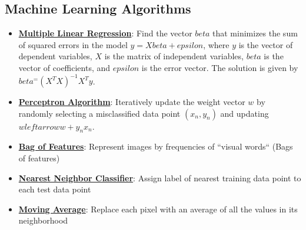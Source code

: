 \documentclass{article}%
\begin{document}
\subsection{Machine Learning Algorithms}%
\label{subsec:MachineLearningAlgorithms}%
\begin{itemize}[leftmargin=*]%
\item \href{https://purdue.brightspace.com/d2l/common/assets/pdfjs-d2l-dist/1.0.14-legacy/web/viewer.html?file=\%2Fcontent\%2Fenforced\%2F1095467-wl.202510.CS.24300.001\%2F05L2-ML Basics.pdf\%3Fou\%3D1095467\&lang=en-us\&container=d2l-fileviewer-rendered-pdf\&fullscreen=d2l-fileviewer-rendered-pdf-dialog\&height=667#page=11}{\textbf{Multiple Linear Regression}}: Find the vector $beta$ that minimizes the sum of squared errors in the model $y = Xbeta + epsilon$, where $y$ is the vector of dependent variables, $X$ is the matrix of independent variables, $beta$ is the vector of coefficients, and $epsilon$ is the error vector. The solution is given by $beta^ = (X^TX)^{-1}X^Ty$.%
\item \href{https://purdue.brightspace.com/d2l/common/assets/pdfjs-d2l-dist/1.0.14-legacy/web/viewer.html?file=\%2Fcontent\%2Fenforced\%2F1095467-wl.202510.CS.24300.001\%2F05L2-ML Basics.pdf\%3Fou\%3D1095467\&lang=en-us\&container=d2l-fileviewer-rendered-pdf\&fullscreen=d2l-fileviewer-rendered-pdf-dialog\&height=667#page=30}{\textbf{Perceptron Algorithm}}: Iteratively update the weight vector $w$ by randomly selecting a misclassified data point $(x_n, y_n)$ and updating $w leftarrow w + y_nx_n$.%
\item \href{https://purdue.brightspace.com/d2l/common/assets/pdfjs-d2l-dist/1.0.14-legacy/web/viewer.html?file=\%2Fcontent\%2Fenforced\%2F1095467-wl.202510.CS.24300.001\%2F07L2-Vision.pdf\%3Fou\%3D1095467\&lang=en-us\&container=d2l-fileviewer-rendered-pdf\&fullscreen=d2l-fileviewer-rendered-pdf-dialog\&height=667#page=16}{\textbf{Bag of Features}}: Represent images by frequencies of ``visual words`` (Bags of features)%
\item \href{https://purdue.brightspace.com/d2l/common/assets/pdfjs-d2l-dist/1.0.14-legacy/web/viewer.html?file=\%2Fcontent\%2Fenforced\%2F1095467-wl.202510.CS.24300.001\%2F07L2-Vision.pdf\%3Fou\%3D1095467\&lang=en-us\&container=d2l-fileviewer-rendered-pdf\&fullscreen=d2l-fileviewer-rendered-pdf-dialog\&height=667#page=30}{\textbf{Nearest Neighbor Classifier}}: Assign label of nearest training data point to each test data point%
\item \href{https://purdue.brightspace.com/d2l/common/assets/pdfjs-d2l-dist/1.0.14-legacy/web/viewer.html?file=\%2Fcontent\%2Fenforced\%2F1095467-wl.202510.CS.24300.001\%2F07L2-Vision.pdf\%3Fou\%3D1095467\&lang=en-us\&container=d2l-fileviewer-rendered-pdf\&fullscreen=d2l-fileviewer-rendered-pdf-dialog\&height=667#page=38}{\textbf{Moving Average}}: Replace each pixel with an average of all the values in its neighborhood%

\end{itemize}
\end{document}
